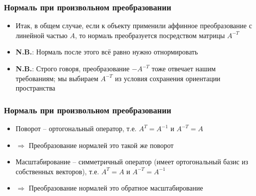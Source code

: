 \documentclass[10pt,handout]{beamer}
\begin{document}
\begin{frame}[fragile]
\frametitle{Нормаль при произвольном преобразовании}
\begin{itemize}
\item Итак, в общем случае, если к объекту применили аффинное преобразование с линейной частью \begin{math}A\end{math}, то нормаль преобразуется посредством матрицы \begin{math}A^{-T}\end{math}
\pause
\item \alert{\textbf{N.B.}}: Нормаль после этого всё равно нужно отнормировать
\pause
\item \alert{\textbf{N.B.}}: Строго говоря, преобразование \begin{math}-A^{-T}\end{math} тоже отвечает нашим требованиям; мы выбираем \begin{math}A^{-T}\end{math} из условия сохранения ориентации пространства
\end{itemize}
\end{frame}

\begin{frame}[fragile]
\frametitle{Нормаль при произвольном преобразовании}
\begin{itemize}
\item Поворот -- ортогональный оператор, т.е. \begin{math}A^T = A^{-1}\end{math} и \begin{math}A^{-T}=A\end{math}
\pause
\item \begin{math}\Longrightarrow\end{math} Преобразование нормалей это такой же поворот
\pause
\begin{equation*}
\end{equation*}
\item Масштабирование -- симметричный оператор (имеет ортогональный базис из собственных векторов), т.е. \begin{math}A^T = A\end{math} и \begin{math}A^{-T}=A^{-1}\end{math}
\pause
\item \begin{math}\Longrightarrow\end{math} Преобразование нормалей это обратное масштабирование
\end{itemize}
\end{frame}
\end{document}
